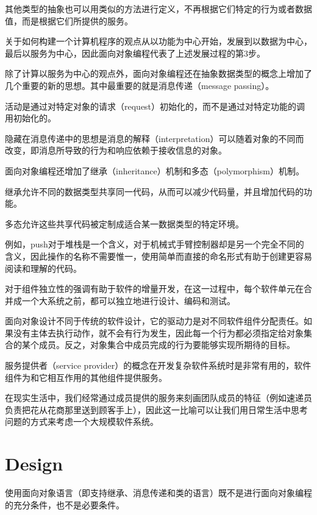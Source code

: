 其他类型的抽象也可以用类似的方法进行定义，不再根据它们特定的行为或者数据值，而是根据它们所提供的服务。

关于如何构建一个计算机程序的观点从以功能为中心开始，发展到以数据为中心，最后以服务为中心，因此面向对象编程代表了上述发展过程的第3步。

除了计算以服务为中心的观点外，面向对象编程还在抽象数据类型的概念上增加了几个重要的新的思想。其中最重要的就是消息传递（message passing）。

活动是通过对特定对象的请求（request）初始化的，而不是通过对特定功能的调用初始化的。


隐藏在消息传递中的思想是消息的解释（interpretation）可以随着对象的不同而改变，即消息所导致的行为和响应依赖于接收信息的对象。



面向对象编程还增加了继承（inheritance）机制和多态（polymorphism）机制。

\begin{compactitem}
\item 继承允许不同的数据类型共享同一代码，从而可以减少代码量，并且增加代码的功能。
\item 多态允许这些共享代码被定制成适合某一数据类型的特定环境。
\end{compactitem}

例如，push对于堆栈是一个含义，对于机械式手臂控制器却是另一个完全不同的含义，因此操作的名称不需要惟一，使用简单而直接的命名形式有助于创建更容易阅读和理解的代码。

对于组件独立性的强调有助于软件的增量开发，在这一过程中，每个软件单元在合并成一个大系统之前，都可以独立地进行设计、编码和测试。

面向对象设计不同于传统的软件设计，它的驱动力是对不同软件组件分配责任。如果没有主体去执行动作，就不会有行为发生，因此每一个行为都必须指定给对象集合的某个成员。反之，对象集合中成员完成的行为要能够实现所期待的目标。


服务提供者（service provider）的概念在开发复杂软件系统时是非常有用的，软件组件为和它相互作用的其他组件提供服务。

在现实生活中，我们经常通过成员提供的服务来刻画团队成员的特征（例如速递员负责把花从花商那里送到顾客手上），因此这一比喻可以让我们用日常生活中思考问题的方式来考虑一个大规模软件系统。


\chapter{Design}

使用面向对象语言（即支持继承、消息传递和类的语言）既不是进行面向对象编程的充分条件，也不是必要条件。

